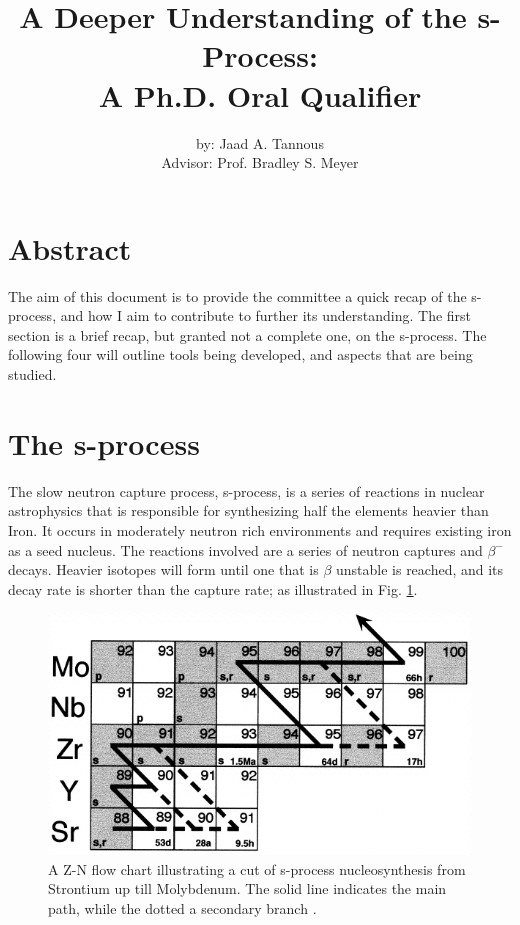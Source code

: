 \documentclass{article}
\title{A Deeper Understanding of the s-Process:\\
A Ph.D. Oral Qualifier}
\author{by: Jaad A. Tannous\\
Advisor: Prof. Bradley S. Meyer}
\date{}
\begin{document}
\maketitle

\section*{Abstract}
The aim of this document is to provide the committee a quick recap of the s-process, and how I aim to 
contribute to further its understanding. The first section is a brief recap, but granted not a complete 
one, on the s-process. The following four will outline tools being developed, and aspects that are being 
studied.

\section*{The s-process}
The slow neutron capture process, s-process, is a series of reactions in nuclear astrophysics that is responsible 
for synthesizing half the elements heavier than Iron. It occurs in moderately neutron rich environments and requires 
existing iron as a seed nucleus. The reactions involved are a series of neutron captures and $\beta^{-}$ decays. Heavier 
isotopes will form until one that is $\beta$ unstable is reached, and its decay rate is shorter than the capture rate; as illustrated 
in Fig. \ref{fig 1}.

\begin{figure}[!htp]
    \centerline{\includegraphics[scale = 0.5]{images/sprocess.png}}
    \caption{A Z-N flow chart illustrating a cut of s-process nucleosynthesis from Strontium up till 
    Molybdenum. The solid line indicates the main path, while the dotted a secondary branch \cite{nic98}.}
    \label{fig 1}
\end{figure}
\end{document}
